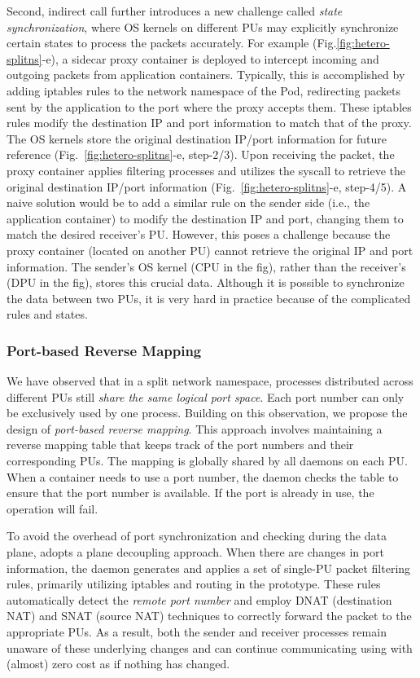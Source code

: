 Second,
indirect call further introduces a new challenge called \emph{state synchronization}, where OS kernels on different PUs may explicitly synchronize certain states to process the packets accurately.
For example (Fig.\ref{fig:hetero-splitns}-e),
a sidecar proxy container is deployed to intercept incoming and outgoing packets from application containers.
Typically, this is accomplished by adding iptables rules to the network namespace of the Pod, redirecting packets sent by the application to the port where the proxy accepts them.
These iptables rules modify the destination IP and port information to match that of the proxy.
The OS kernels store the original destination IP/port information for future reference (Fig.~\ref{fig:hetero-splitns}-e, step-2/3).
Upon receiving the packet, the proxy container applies filtering processes and utilizes the  syscall to retrieve the original destination IP/port information (Fig.~\ref{fig:hetero-splitns}-e, step-4/5).
A naive solution would be to add a similar rule on the sender side (i.e., the application container) to modify the destination IP and port, changing them to match the desired receiver's PU.
However, this poses a challenge because the proxy container (located on another PU) cannot retrieve the original IP and port information.
The sender's OS kernel (CPU in the fig), rather than the receiver's (DPU in the fig), stores this crucial data.
Although it is possible to synchronize the data between two PUs, it is very hard in practice because of the complicated rules and states.

\subsubsection{Port-based Reverse Mapping}
We have observed that in a split network namespace, processes distributed across different PUs still \emph{share the same logical port space}.
Each port number can only be exclusively used by one process.
Building on this observation, we propose the design of \emph{port-based reverse mapping}.
This approach involves maintaining a reverse mapping table that keeps track of the port numbers and their corresponding PUs. The mapping is globally shared by all \os daemons on each PU.
When a container needs to use a port number, the \os daemon checks the table to ensure that the port number is available. If the port is already in use, the operation will fail.

To avoid the overhead of port synchronization and checking during the data plane, \os adopts a plane decoupling approach.
When there are changes in port information, the \os daemon generates and applies a set of single-PU packet filtering rules, primarily utilizing iptables and routing in the prototype.
These rules automatically detect the \emph{remote port number} and employ DNAT (destination NAT) and SNAT (source NAT) techniques to correctly forward the packet to the appropriate PUs.
As a result, both the sender and receiver processes remain unaware of these underlying changes and can continue communicating using  with (almost) zero cost as if nothing has changed.

